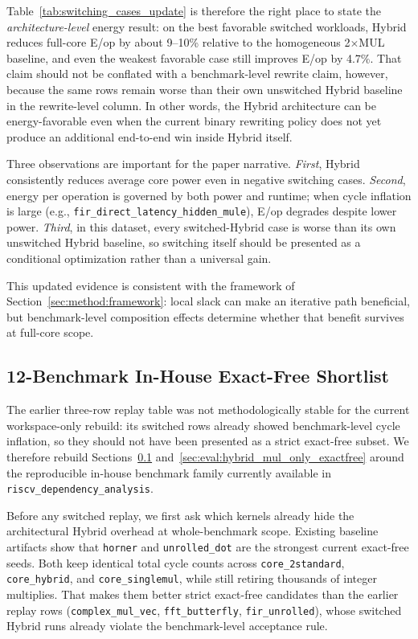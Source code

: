 Table~\ref{tab:switching_cases_update} is therefore the right place to state
the \emph{architecture-level} energy result: on the best favorable switched
workloads, Hybrid reduces full-core E/op by about 9--10\% relative to the
homogeneous 2$\times$MUL baseline, and even the weakest favorable case still
improves E/op by 4.7\%. That claim should not be conflated with a
benchmark-level rewrite claim, however, because the same rows remain worse than
their own unswitched Hybrid baseline in the rewrite-level column. In other
words, the Hybrid architecture can be energy-favorable even when the current
binary rewriting policy does not yet produce an additional end-to-end win
inside Hybrid itself.

Three observations are important for the paper narrative.
\emph{First}, Hybrid consistently reduces average core power even in
negative switching cases. \emph{Second}, energy per operation is governed
by both power and runtime; when cycle inflation is large
(e.g., \texttt{fir\_direct\_latency\_hidden\_mule}), E/op degrades despite
lower power. \emph{Third}, in this dataset, every switched-Hybrid case is
worse than its own unswitched Hybrid baseline, so switching itself should
be presented as a conditional optimization rather than a universal gain.

This updated evidence is consistent with the framework of
Section~\ref{sec:method:framework}: local slack can make an iterative path
beneficial, but benchmark-level composition effects determine whether that
benefit survives at full-core scope.

\subsection{12-Benchmark In-House Exact-Free Shortlist}\label{sec:eval:1ghz_exactfree}

The earlier three-row replay table was not methodologically stable for
the current workspace-only rebuild: its switched rows already showed
benchmark-level cycle inflation, so they should not have been presented
as a strict exact-free subset. We therefore rebuild
Sections~\ref{sec:eval:1ghz_exactfree}
and~\ref{sec:eval:hybrid_mul_only_exactfree} around the reproducible
in-house benchmark family currently available in
\texttt{riscv\_dependency\_analysis}.

Before any switched replay, we first ask which kernels already hide the
architectural Hybrid overhead at whole-benchmark scope. Existing
baseline artifacts show that \texttt{horner} and
\texttt{unrolled\_dot} are the strongest current exact-free seeds. Both
keep identical total cycle counts across \texttt{core\_2standard},
\texttt{core\_hybrid}, and \texttt{core\_singlemul}, while still
retiring thousands of integer multiplies. That makes them better strict
exact-free candidates than the earlier replay rows
(\texttt{complex\_mul\_vec}, \texttt{fft\_butterfly},
\texttt{fir\_unrolled}), whose switched Hybrid runs already violate the
benchmark-level acceptance rule.

